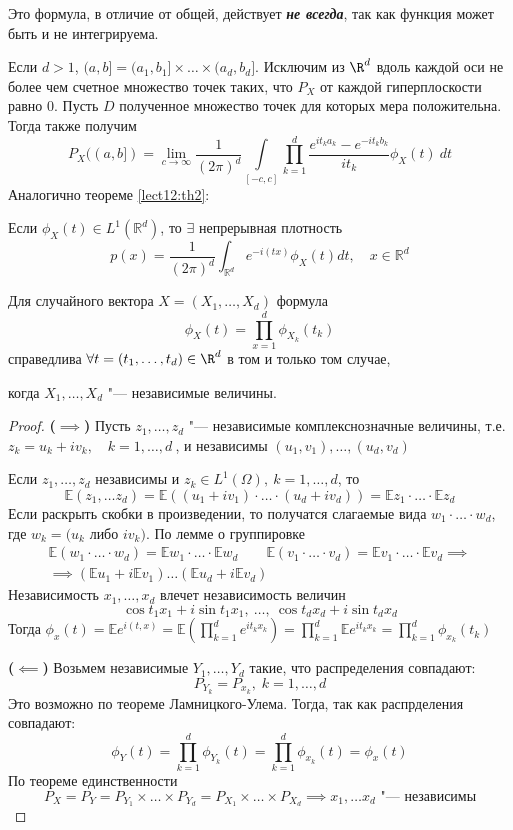 \documentclass[a4paper,reqno]{amsart}
\begin{document}
\begin{nb}
    Это формула, в отличие от общей, действует \textbf{\emph{не всегда}}, так как функция может быть и не интегрируема.
\end{nb}
Если $d > 1$, $(a, b] = (a_1, b_1]\times\ldots\times(a_d, b_d]$. Исключим из $\R^d$ вдоль каждой оси не более чем счетное множество точек таких, что $P_X$ от каждой гиперплоскости равно 0. Пусть $D$ полученное множество точек для которых мера положительна. Тогда также получим
$$P_X((a, b] ) = \lim_{c\to \infty} \frac{1}{(2\pi)^d}\int\limits_{[-c, c]} \prod_{k=1}^{d} \frac{e^{it_ka_k} - e^{-it_kb_k}}{it_k} \phi_X(t) \:dt$$
Аналогично теореме \ref{lect12:th2}:

Если $\phi_X(t) \in L^1(\mathbb{R}^d)$, то $\exists$ непрерывная плотность
$$p(x) = \frac{1}{(2\pi)^d}\int_{\mathbb{R}^d} e^{-i(tx)}\phi_X(t)dt, \quad x\in \mathbb{R}^d $$
\begin{theorem} \label{lect12:th3}
    Для случайного вектора $X = (X_1, \ldots, X_d)$ формула
    $$\phi_X(t) = \prod_{x=1}^d \phi_{X_k} (t_k)$$
    справедлива $\forall t = (t_1, \ldots, t_d) \in \R^d$ в том и только том случае, 

    когда $X_1, \ldots, X_d$ "--- независимые величины.
\begin{proof}
    \textbf{($\implies$)} Пусть $z_1, \ldots, z_d$ "--- независимые комплекснозначные величины, т.е. $z_k = u_k + iv_k,\quad k = 1,\ldots,d\:$, и независимы $(u_1, v_1),\ldots,(u_d, v_d)$

    Если $z_1, \ldots, z_d$ независимы и $z_k \in L^1(\Omega), \:k = 1,\ldots, d$, то
    $$\mathbb{E}(z_1, \ldots z_d) = \mathbb{E}((u_1 + iv_1)\cdot \ldots \cdot (u_d + iv_d)) = \mathbb{E}z_1 \cdot \ldots \cdot \mathbb{E}z_d$$
    Если раскрыть скобки в произведении, то получатся слагаемые вида $w_1 \cdot \ldots \cdot w_d$, где $w_k = (u_k$ либо $iv_k)$. По лемме о группировке
    \begin{gather*}
        \mathbb{E} (w_1\cdot \ldots \cdot w_d) = \mathbb{E} w_1 \cdot \ldots \cdot \mathbb{E}w_d \qquad \mathbb{E} (v_1\cdot \ldots \cdot v_d) = \mathbb{E} v_1 \cdot \ldots \cdot \mathbb{E}v_d \implies\\
        \implies(\mathbb{E}u_1 + i\mathbb{E}v_1) \ldots (\mathbb{E}u_d + i\mathbb{E}v_d)
    \end{gather*}
    Независимость $x_1, \ldots, x_d$ влечет независимость величин $$\cos{t_1x_1} + i\sin{t_1x_1}, \:\ldots,\:\cos{t_dx_d} + i\sin{t_dx_d}$$
    Тогда $\phi_x(t) = \mathbb{E} e^{i(t,x)} = \mathbb{E}\left( \prod\limits_{k=1}^d e^{it_kx_k}\right) = \prod\limits_{k=1}^d \mathbb{E} e^{it_kx_k} = \prod\limits_{k=1}^d \phi_{x_k}(t_k)$

    \textbf{($\impliedby$)} Возьмем независимые $Y_1, \ldots, Y_d$ такие, что распределения совпадают: $$P_{Y_k} = P_{x_k}, \; k = 1, \ldots, d$$
    Это возможно по теореме Ламницкого-Улема. Тогда, так как распрделения совпадают:
    $$\phi_{Y}(t) = \prod\limits_{k=1}^d \phi_{Y_k}(t) = \prod\limits_{k=1}^d \phi_{x_k}(t) = \phi_x(t)$$
    По теореме единственности $$P_X = P_Y = P_{Y_1} \times \ldots\times P_{Y_d} = P_{X_1} \times \ldots \times P_{X_d} \implies x_1, \ldots x_d \mbox{ "--- независимы}$$
\end{proof}
\end{theorem}
\end{document}
